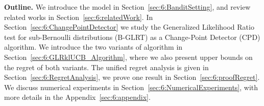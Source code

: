 



\textbf{Outline.}
%
We introduce the model in Section~\ref{sec:6:BanditSetting}, and review related works in Section~\ref{sec:6:relatedWork}.
In Section~\ref{sec:6:ChangePointDetector} we study the Generalized Likelihood Ratio test for sub-Bernoulli distributions (B-GLRT) as a Change-Point Detector (CPD) algorithm.
We introduce the two variants of \GLRklUCB{} algorithm in Section~\ref{sec:6:GLRklUCB_Algorithm}, where we also present upper bounds on the regret of both variants.
The unified regret analysis is given in Section~\ref{sec:6:RegretAnalysis}, we prove one result in Section~\ref{sec:6:proofRegret}.
We discuss numerical experiments in Section~\ref{sec:6:NumericalExperiments}, with more details in the Appendix~\ref{sec:6:appendix}.

